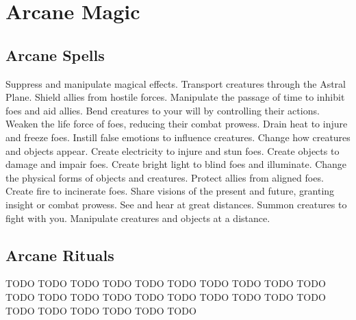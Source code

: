 \small
\section{Arcane Magic}\label{Arcane Magic}
\subsection{Arcane Spells}\label{Arcane Spells}
\begin{spelllist}
 Suppress and manipulate magical effects.
 Transport creatures through the Astral Plane.
 Shield allies from hostile forces.
 Manipulate the passage of time to inhibit foes and aid allies.
 Bend creatures to your will by controlling their actions.
 Weaken the life force of foes, reducing their combat prowess.
 Drain heat to injure and freeze foes.
 Instill false emotions to influence creatures.
 Change how creatures and objects appear.
 Create electricity to injure and stun foes.
 Create objects to damage and impair foes.
 Create bright light to blind foes and illuminate.
 Change the physical forms of objects and creatures.
 Protect allies from aligned foes.
 Create fire to incinerate foes.
 Share visions of the present and future, granting insight or combat prowess.
 See and hear at great distances.
 Summon creatures to fight with you.
 Manipulate creatures and objects at a distance.
\end{spelllist}
\subsection{Arcane Rituals}\label{Arcane Rituals}
\begin{spelllist}
 TODO
 TODO
 TODO
 TODO
 TODO
 TODO
 TODO
 TODO
 TODO
 TODO
 TODO
 TODO
 TODO
 TODO
 TODO
 TODO
 TODO
 TODO
 TODO
 TODO
 TODO
 TODO
 TODO
 TODO
 TODO
 TODO
\end{spelllist}
\small

